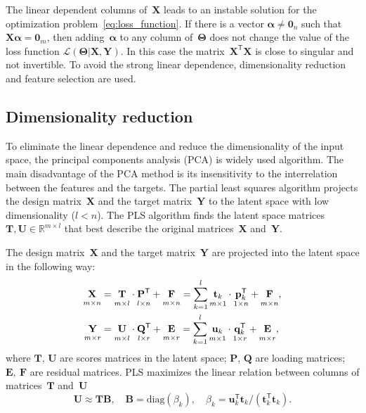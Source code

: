 \documentclass[12pt,twoside]{article}
\theoremstyle{definition}
\newcommand{\bY}{\mathbf{Y}}
\newcommand{\bX}{\mathbf{X}}
\newcommand{\bu}{\mathbf{u}}
\newcommand{\bt}{\mathbf{t}}
\newcommand{\bp}{\mathbf{p}}
\newcommand{\bq}{\mathbf{q}}
\newcommand{\bP}{\mathbf{P}}
\newcommand{\bT}{\mathbf{T}}
\newcommand{\bB}{\mathbf{B}}
\newcommand{\bQ}{\mathbf{Q}}
\newcommand{\bE}{\mathbf{E}}
\newcommand{\bF}{\mathbf{F}}
\newcommand{\bU}{\mathbf{U}}
\newcommand{\T}{\mathsf{T}}
\newcommand{\bTheta}{\boldsymbol{\Theta}}
\newcommand{\bZero}{\boldsymbol{0}}
\begin{document}
The linear dependent columns of~$\bX$ leads to an instable solution for the optimization problem~\eqref{eq:loss_function}.
If there is a vector $\boldsymbol{\alpha} \neq \bZero_n$ such that $\bX \boldsymbol{\alpha}= \bZero_m$, then adding~$\boldsymbol{\alpha}$ to any column of~$\bTheta$ does not change the value of the loss function $\mathcal{L}(\bTheta | \bX, \bY)$.
In this case the matrix~$\bX^{\T} \bX$ is close to singular and not invertible.
To avoid the strong linear dependence, dimensionality reduction and feature selection are used.

\subsection{Dimensionality reduction}

To eliminate the linear dependence and reduce the dimensionality of the input space, the principal components analysis (PCA) is widely used algorithm. 
The main disadvantage of the PCA method is its insensitivity to the interrelation between the features and the targets.
The partial least squares algorithm projects the design matrix~$\bX$ and the target matrix~$\bY$ to the latent space with low dimensionality ($l < n$).
The PLS algorithm finds the latent space matrices $\bT, \bU \in \mathbb{R}^{m \times l}$ that best describe the original matrices~$\bX$ and~$\bY$.

The design matrix~$\bX$ and the target matrix~$\bY$ are projected into the latent space in the following way:
\begin{align}
\label{eq:PLS_X}
\underset{m \times n}{\vphantom{\bQ}\bX} 
&= \underset{m \times l}{\vphantom{\bQ}\bT} \cdot \underset{l \times n}{\vphantom{\bQ}\bP^{\T}} + \underset{m \times n}{\vphantom{\bQ}\bF} 
= \sum_{k=1}^l \underset{m \times 1}{\vphantom{\bp_k^{\T}}\bt_k} \cdot \underset{1 \times n}{\bp_k^{\T}} + \underset{m \times n}{\vphantom{\bp_k^{\T}}\bF},\\
\label{eq:PLS_Y}
\underset{m \times r}{\vphantom{\bQ}\bY} 
&= \underset{m \times l}{\vphantom{\bQ}\bU} \cdot \underset{l \times r}{\bQ^{\T}} + \underset{m \times r}{\vphantom{\bQ}\bE}
=  \sum_{k=1}^l  \underset{m \times 1}{\vphantom{\bq_k^{\T}}\bu_k} \cdot \underset{1 \times r}{\bq_k^{\T}} +  \underset{m \times r}{\vphantom{\bq_k^{\T}}\bE},
\end{align}
where $\bT$, $\bU$ are scores matrices in the latent space; $\bP$, $\bQ$ are loading matrices; $\bE,\ \bF$ are residual matrices. PLS maximizes the linear relation between columns of matrices~$\bT$ and~$\bU$
\begin{equation*}
\bU \approx \bT \bB, \quad \bB = \text{diag}(\beta_k), \quad \beta_k = \bu_k^{\T}\bt_k / (\bt_k^{\T}\bt_k).
\end{equation*}
\end{document}
